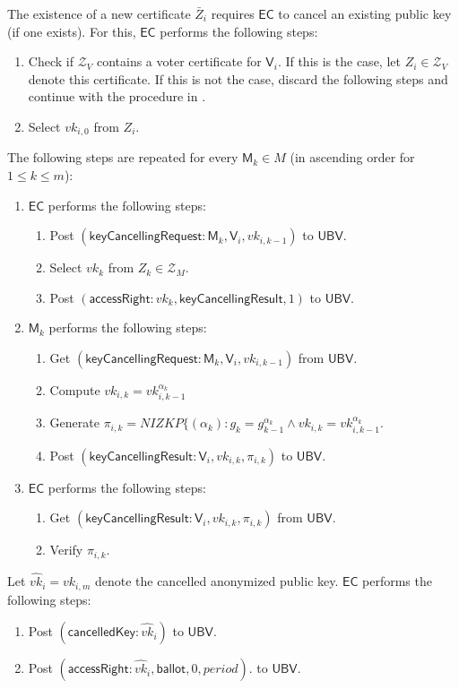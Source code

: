 \documentclass[bibtotoc,halfparskip,oneside]{scrreprt}
\newcommand{\period}{\mathit{period}\xspace}
\newcommand{\vk}[1]{\mathit{vk}_{#1}\xspace}
\newcommand{\vkhat}[1]{\hat{\mathit{vk}}_{#1}\xspace}
\newcommand{\EC}{\ensuremath{\mathsf{EC}}\xspace}
\newcommand{\UBV}{\ensuremath{\mathsf{UBV}}\xspace}
\newcommand{\Mixer}[1]{\ensuremath{\mathsf{M}_{#1}}\xspace}
\newcommand{\Voter}[1]{\ensuremath{\mathsf{V}_{#1}}\xspace}
\begin{document}
	The existence of a new certificate $\bar{Z}_i$ requires \EC to cancel an existing public key (if one exists). For this, \EC performs the following steps: 
	\begin{enumerate}
		\item Check if $\mathcal{Z}_V$ contains a voter certificate for $\Voter{i}$. If this is the case, let $Z_i\in\mathcal{Z}_V$ denote this certificate. If this is not the case, discard the following steps and continue with the procedure in .
		\item Select $\vk{i,0}$ from $Z_i$.
	\end{enumerate}	
	The following steps are repeated for every $\Mixer{k}\in M$ (in ascending order for $1\leq k\leq m$):
	\begin{enumerate}[resume]
		\item \EC performs the following steps:
		\begin{enumerate}
			\item Post $(\mathsf{keyCancellingRequest}:\Mixer{k}, \Voter{i}, \vk{i,k-1})$ to \UBV.
			\item Select $\vk{k}$ from $Z_{k}\in \mathcal{Z}_{M}$.
			\item Post $(\mathsf{accessRight}:\vk{k},\mathsf{keyCancellingResult},1)$ to \UBV.
		\end{enumerate}
		\item $\Mixer{k}$ performs the following steps:
		\begin{enumerate}
			\item Get $(\mathsf{keyCancellingRequest}: \Mixer{k}, \Voter{i}, \vk{i,k-1})$ from \UBV.
			\item Compute $\vk{i,k} = \vk{i,k-1}^{\alpha_k}$
			\item Generate $\pi_{i,k}=\mathit{NIZKP}\{(\alpha_k):g_k=g_{k-1}^{\alpha_k}\wedge \vk{i,k} = \vk{i,k-1}^{\alpha_k}$.
			\item Post $(\mathsf{keyCancellingResult}:\Voter{i}, \vk{i,k}, \pi_{i,k})$ to \UBV.
		\end{enumerate}
		\item \EC performs the following steps:
		\begin{enumerate}
			\item Get $(\mathsf{keyCancellingResult}:\Voter{i}, \vk{i,k}, \pi_{i,k})$ from \UBV.
			\item Verify $\pi_{i,k}$.
		\end{enumerate}
	\end{enumerate}
	Let $\vkhat{i}=\vk{i,m}$ denote the cancelled anonymized public key. \EC performs the following steps:
	\begin{enumerate}
		\item Post $(\mathsf{cancelledKey}:\vkhat{i})$ to \UBV.
		\item Post $(\mathsf{accessRight}:\vkhat{i}, \mathsf{ballot}, 0,\period)$. to \UBV.
	\end{enumerate}
	
\end{document}
